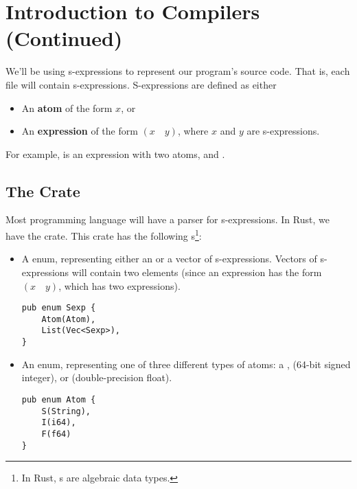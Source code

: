 \documentclass[letterpaper]{article}
\begin{document}
\section{Introduction to Compilers (Continued)}
We'll be using s-expressions to represent our program's source code. That is, each  file will contain s-expressions. S-expressions are defined as either 
\begin{itemize}
    \item An \textbf{atom} of the form $x$, or 
    \item An \textbf{expression} of the form $(x \quad y)$, where $x$ and $y$ are s-expressions. 
\end{itemize}
For example,  is an expression with two atoms,  and . 

\subsection{The  Crate}
Most programming language will have a parser for s-expressions. In Rust, we have the  crate. This crate has the following s\footnote{In Rust, s are algebraic data types.}:
\begin{itemize}
    \item A  enum, representing either an  or a vector of s-expressions. Vectors of s-expressions will contain two elements (since an expression has the form $(x \quad y)$, which has two expressions). 
    \begin{verbatim}
pub enum Sexp {
    Atom(Atom),
    List(Vec<Sexp>),
}
    \end{verbatim}

    \item An  enum, representing one of three different types of atoms: a ,  (64-bit signed integer), or  (double-precision float). 
    \begin{verbatim}
pub enum Atom {
    S(String),
    I(i64),
    F(f64)
}\end{verbatim}
\end{itemize}
\end{document}
